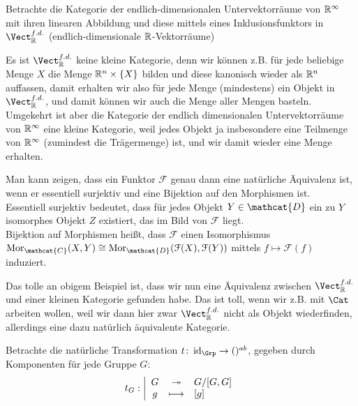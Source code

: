     \begin{example}
        Betrachte die Kategorie der endlich-dimensionalen Untervektorräume von $\mathbb{R}^{\infty}$ mit ihren linearen Abbildung und diese mittels eines Inklusionsfunktors in $\Vect_{\R}^{f.d.}$ (endlich-dimensionale $\mathbb{R}$-Vektorräume)
    \end{example}

    \begin{oral}
        Es ist $\Vect_{\R}^{f.d.}$ keine kleine Kategorie, denn wir können z.B. für jede beliebige Menge $X$ die Menge  $\mathbb{R}^n \times \left \{X\right\} $ bilden und diese kanonisch wieder als $\mathbb{R}^n$ auffassen, damit erhalten wir also für jede Menge (mindestens) ein Objekt in $\Vect_{\R}^{f.d.}$, und damit können wir auch die Menge aller Mengen basteln. \\
        Umgekehrt ist aber die Kategorie der endlich dimensionalen Untervektorräume von $\mathbb{R}^{\infty}$ eine kleine Kategorie, weil jedes Objekt ja insbesondere eine Teilmenge von $\mathbb{R}^{\infty}$ (zumindest die Trägermenge) ist, und wir damit wieder eine Menge erhalten.
    \end{oral}

    \begin{oral}
        Man kann zeigen, dass ein Funktor $\mathcal{F}$ genau dann eine natürliche Äquivalenz ist, wenn er essentiell surjektiv  und eine Bijektion auf den Morphismen ist. \\
        Essentiell surjektiv bedeutet, dass für jedes Objekt $Y\in \mathcat{D}$ ein zu $Y$ isomorphes Objekt  $Z$ existiert, das im Bild von  $\mathcal{F}$ liegt. \\
        Bijektion auf Morphismen heißt, dass $\mathcal{F}$ einen Isomorphismus $\Mor_{\mathcat{C}}(X,Y) \cong \Mor_{\mathcat{D}}(\mathcal{F}(X), \mathcal{F}(Y))$ mittels $f \mapsto \mathcal{F}(f)$ induziert.
    \end{oral}

\begin{oral}
    Das tolle an obigem Beispiel ist, dass wir nun eine Äquivalenz zwischen $\Vect_{\R}^{f.d.}$ und einer kleinen Kategorie gefunden habe. Das ist toll, wenn wir z.B. mit $\Cat$ arbeiten wollen, weil wir dann hier zwar  $\Vect_{\R}^{f.d.}$ nicht als Objekt wiederfinden, allerdings eine dazu natürlich äquivalente Kategorie.
\end{oral}

\begin{example}
    Betrachte die natürliche Transformation $t\colon \id_{\Grp} \to  ()^{ab}$, gegeben durch Komponenten für jede Gruppe $G$:
        \begin{equation*}
        t_G: \left| \begin{array}{c c l} 
            G & \twoheadrightarrow & G / [G,G] \\
            g & \longmapsto &  [g]
        \end{array} \right.
    \end{equation*}
\end{example}

